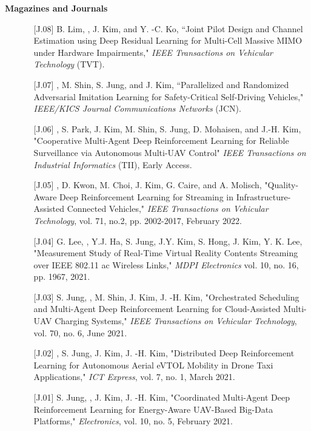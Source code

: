 \documentclass[10pt,letterpaper]{article}
\begin{document}
\headedsection
  {\textbf{Magazines and Journals}}
  {} {
      \vspace{0.3mm}
      \vspace{-0.7mm}
      \begin{itemize} \itemsep=-0.1mm
      \item[]
      \begin{itemize}
         \item[\textsf{[J.08]}] B. Lim, , J. Kim, and Y. -C. Ko, ``Joint Pilot Design and Channel Estimation using Deep Residual Learning for Multi-Cell Massive MIMO under Hardware Impairments," \textit{IEEE Transactions on Vehicular Technology} (TVT). 
         \item[\textsf{[J.07]}] , M. Shin, S. Jung, and J. Kim, ``Parallelized and Randomized Adversarial Imitation Learning for Safety-Critical Self-Driving Vehicles," \textit{IEEE/KICS Journal Communications Networks} (JCN).
          \item[\textsf{[J.06]}] 
          ,  S. Park, J. Kim, M. Shin, S. Jung, D. Mohaisen, and J.-H. Kim, "Cooperative Multi-Agent Deep Reinforcement Learning for Reliable Surveillance via Autonomous Multi-UAV Control" \textit{IEEE Transactions on Industrial Informatics} (TII), Early Access.
          \item[\textsf{[J.05]}] 
          , D. Kwon, M. Choi, J. Kim, G. Caire, and A. Molisch, "Quality-Aware Deep Reinforcement Learning for Streaming in Infrastructure-Assisted Connected Vehicles," \textit{IEEE Transactions on Vehicular Technology}, vol. 71, no.2, pp. 2002-2017, February 2022.
          \item[\textsf{[J.04]}] 
          G. Lee, , Y.J. Ha, S. Jung, J.Y. Kim, S. Hong, J. Kim, Y. K. Lee, "Measurement Study of Real-Time Virtual Reality Contents Streaming over IEEE 802.11 ac Wireless Links," \textit{MDPI Electronics} vol. 10, no. 16, pp. 1967, 2021.
          \item[\textsf{[J.03]}] 
          S. Jung, , M. Shin, J. Kim, J. -H. Kim, "Orchestrated Scheduling and Multi-Agent Deep Reinforcement Learning for Cloud-Assisted Multi-UAV Charging Systems," \textit{IEEE Transactions on Vehicular Technology}, vol. 70, no. 6, June 2021.
          \item[\textsf{[J.02]}] 
          , S. Jung, J. Kim, J. -H. Kim, "Distributed Deep Reinforcement Learning for Autonomous Aerial eVTOL Mobility in Drone Taxi Applications," \textit{ICT Express}, vol. 7, no. 1, March 2021.
          \item[\textsf{[J.01]}] 
          S. Jung, , J. Kim, J. -H. Kim, "Coordinated Multi-Agent Deep Reinforcement Learning for Energy-Aware UAV-Based Big-Data Platforms," \textit{Electronics}, vol. 10, no. 5, February 2021.
      
         \end{itemize}
         \end{itemize}
}
\end{document}
